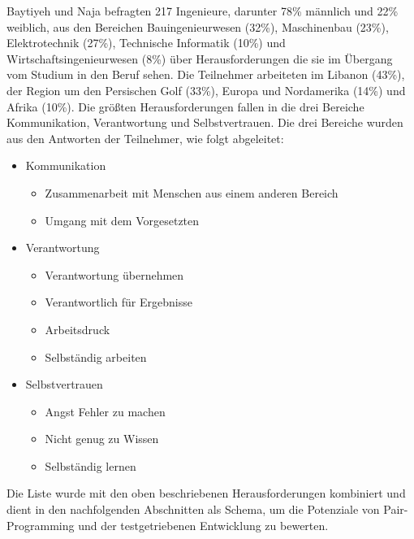 Baytiyeh und Naja \cite{Baytiyeh2011ChallengesCareer} befragten 217 Ingenieure, darunter 78\% männlich und 22\% weiblich, aus den Bereichen Bauingenieurwesen (32\%), Maschinenbau (23\%), Elektrotechnik (27\%), Technische Informatik (10\%) und Wirtschaftsingenieurwesen (8\%) über Herausforderungen die sie im Übergang vom Studium in den Beruf sehen. Die Teilnehmer arbeiteten im Libanon (43\%), der Region um den Persischen Golf (33\%), Europa und Nordamerika (14\%) und Afrika (10\%). Die größten Herausforderungen fallen in die drei Bereiche Kommunikation, Verantwortung und Selbstvertrauen. Die drei Bereiche wurden aus den Antworten der Teilnehmer, wie folgt abgeleitet:
\begin{itemize}
\item Kommunikation
\begin{itemize}
  \item Zusammenarbeit mit Menschen aus einem anderen Bereich
  \item Umgang mit dem Vorgesetzten
\end{itemize}
\item Verantwortung
\begin{itemize}
  \item Verantwortung übernehmen
  \item Verantwortlich für Ergebnisse
  \item Arbeitsdruck
  \item Selbständig arbeiten
\end{itemize}
\item Selbstvertrauen
\begin{itemize}
  \item Angst Fehler zu machen
  \item Nicht genug zu Wissen
  \item Selbständig lernen
\end{itemize}
\end{itemize}
Die Liste wurde mit den oben beschriebenen Herausforderungen kombiniert und dient in den nachfolgenden Abschnitten als Schema, um die Potenziale von Pair-Programming und der testgetriebenen Entwicklung zu bewerten.
